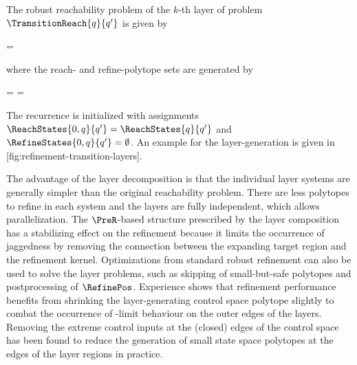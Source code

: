     The robust reachability problem of the $k$-th layer of problem $\TransitionReach{q}{q'}$ is given by

    \startformula
         = 
    \stopformula

    where the reach- and refine-polytope sets are generated by

    \startformula
        \startalign[n=2,align={right,left}]
            \NC {} =
            \NC {} \cup {} \quad\EndAnd
            \NR
            \NC {} =
            \NC {} \EndPeriod
            \NR
        \stopalign
    \stopformula

    The recurrence is initialized with assignments $\ReachStates{0, q}{q'} = \ReachStates{q}{q'}$ and $\RefineStates{0, q}{q'} = \emptyset$.
    An example for the layer-generation is given in [fig:refinement-transition-layers].

    The advantage of the layer decomposition is that the individual layer systems are generally simpler than the original reachability problem.
    There are less polytopes to refine in each system and the layers are fully independent, which allows parallelization.
    The $\PreR$-based structure prescribed by the layer composition has a stabilizing effect on the refinement because it limits the occurrence of jaggedness by removing the connection between the expanding target region and the refinement kernel.
    Optimizations from standard robust refinement can also be used to solve the layer problems, such as skipping of small-but-safe polytopes and postprocessing of $\RefinePos$.
    Experience shows that refinement performance benefits from shrinking the layer-generating control space polytope slightly to combat the occurrence of \epsilon-limit behaviour on the outer edges of the layers.
    Removing the extreme control inputs at the (closed) edges of the control space has been found to reduce the generation of small state space polytopes at the edges of the layer regions in practice.




